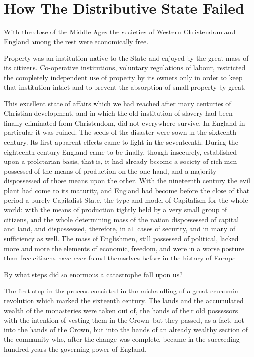 \documentclass{book}
\begin{document}
\chapter{How The Distributive State Failed}
\label{chapter-4}
With the close of the Middle Ages the societies of Western Christendom and England among the rest were economically free.

Property was an institution native to the State and enjoyed by the great mass of its citizens. Co-operative institutions, voluntary regulations of labour, restricted the completely independent use of property by its owners only in order to keep that institution intact and to prevent the absorption of small property by great.

This excellent state of affairs which we had reached after many centuries of Christian development, and in which the old institution of slavery had been finally eliminated from Christendom, did not everywhere survive. In England in particular it was ruined. The seeds of the disaster were sown in the sixteenth century. Its first apparent effects came to light in the seventeenth. During the eighteenth century England came to be finally, though insecurely, established upon a proletarian basis, that is, it had already become a society of rich men possessed of the means of production on the one hand, and a majority dispossessed of those means upon the other. With the nineteenth century the evil plant had come to its maturity, and England had become before the close of that period a purely Capitalist State, the type and model of Capitalism for the whole world: with the means of production tightly held by a very small group of citizens, and the whole determining mass of the nation dispossessed of capital and land, and dispossessed, therefore, in all cases of security, and in many of sufficiency as well. The mass of Englishmen, still possessed of political, lacked more and more the elements of economic, freedom, and were in a worse posture than free citizens have ever found themselves before in the history of Europe.

By what steps did so enormous a catastrophe fall upon us?

The first step in the process consisted in the mishandling of a great economic revolution which marked the sixteenth century. The lands and the accumulated wealth of the monasteries were taken out of, the hands of their old possessors with the intention of vesting them in the Crown–but they passed, as a fact, not into the hands of the Crown, but into the hands of an already wealthy section of the community who, after the change was complete, became in the succeeding hundred years the governing power of England.
\end{document}
